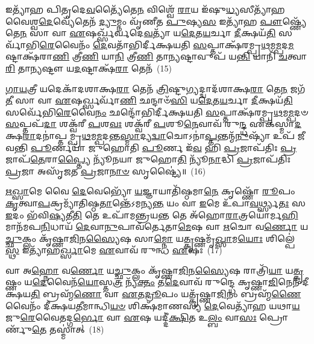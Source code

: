 𑌇𑌤𑍍𑌯𑌾᳴𑌹 𑌪𑌿𑌤𑍃𑌦𑍇\-\ul{𑌵}\-𑌤𑍍𑌯𑍈᳴𑌤𑍇\-\ul{𑌨} 𑌵𑌿𑌶𑍍𑌵𑍇᳴ \ul{𑌰𑌾}\-𑌯 𑌇᳴𑌷𑍁\-\ul{𑌧𑍍𑌯}\-𑌸𑍀𑌤𑍍𑌯𑌾᳴𑌹 𑌵𑍈𑌶𑍍𑌵\-\ul{𑌦𑍇}\-𑌵𑍍𑌯𑍇᳴𑌤𑍇𑌨᳴ \ul{𑌦𑍍𑌯𑍁}\-𑌮𑍍𑌨𑌂 𑌵𑍃᳴𑌣𑍀𑌤 \ul{𑌪𑍁}\-𑌷𑍍𑌯\-\ul{𑌸} 𑌇𑌤𑍍𑌯𑌾᳴𑌹 \ul{𑌪𑍗}\-𑌷𑍍𑌣𑍍𑌯𑍇᳴𑌤𑍇\-\ul{𑌨} 𑌸𑌾 𑌵𑌾 \ul{𑌏}\-𑌷𑌰𑍍𑌖𑍍𑌸᳴𑌰𑍍𑌵𑌦𑍇\-\ul{𑌵}\-𑌤𑍍𑌯𑌾᳴ 𑌯\-\ul{𑌦𑍇}\-𑌤\-\ul{𑌯}\-𑌰𑍍𑌚𑌾 \ul{𑌦𑍀}\-𑌕𑍍𑌷𑌯᳴\-\ul{𑌤𑌿} 𑌸𑌰𑍍𑌵𑌾᳴𑌭𑌿\-\ul{𑌰𑍇}\-𑌵𑍈𑌨𑌂᳴ \ul{𑌦𑍇}\-𑌵𑌤𑌾᳴𑌭𑌿𑌰𑍍𑌦𑍀𑌕𑍍𑌷𑌯𑌤𑌿 \ul{𑌸}\-𑌪𑍍𑌤𑌾𑌕𑍍𑌷᳴𑌰𑌮𑍍𑌪𑍍𑌰\-\ul{𑌥}\-𑌮\-\ul{𑌮𑍍𑌪}\-𑌦\-\ul{𑌮}\-𑌷𑍍𑌟𑌾𑌕𑍍𑌷᳴𑌰𑌾\-\ul{𑌣𑌿} 𑌤𑍍𑌰𑍀\-\ul{𑌣𑌿} 𑌯𑌾\-\ul{𑌨𑌿} 𑌤𑍍𑌰𑍀\-\ul{𑌣𑌿} 𑌤𑌾\-\ul{𑌨𑍍𑌯}\-𑌷𑍍𑌟𑌾𑌵𑍁𑌪᳴ 𑌯\-\ul{𑌨𑍍𑌤𑌿} 𑌯𑌾𑌨𑌿᳴ \ul{𑌚}\-𑌤𑍍𑌵𑌾\-\ul{𑌰𑌿} 𑌤𑌾\-\ul{𑌨𑍍𑌯}\-𑌷𑍍𑌟𑍗 𑌯\-\ul{𑌦}\-𑌷𑍍𑌟𑌾𑌕𑍍𑌷᳴\-\ul{𑌰𑌾} 𑌤𑍇𑌨᳴~(15)

\-\ul{𑌗𑌾}\-\-\ul{𑌯}\-𑌤𑍍𑌰𑍀 𑌯𑌦𑍇𑌕𑌾᳴\-𑌦𑌶𑌾𑌕𑍍𑌷\-\ul{𑌰𑌾} 𑌤𑍇𑌨᳴ \ul{𑌤𑍍𑌰𑌿}\-𑌷𑍍𑌟𑍁𑌗𑍍𑌯𑌦𑍍𑌦𑍍𑌵𑌾𑌦᳴𑌶𑌾𑌕𑍍𑌷\-\ul{𑌰𑌾} 𑌤𑍇\-\ul{𑌨} 𑌜𑌗᳴\-\ul{𑌤𑍀} 𑌸𑌾 𑌵𑌾 \ul{𑌏}\-𑌷𑌰𑍍𑌖𑍍𑌸𑌰𑍍𑌵𑌾᳴\-\ul{𑌣𑌿} 𑌛𑌨𑍍𑌦𑌾𑍞᳴\-\ul{𑌸𑌿} 𑌯\-\ul{𑌦𑍇}\-𑌤\-\ul{𑌯}\-𑌰𑍍𑌚𑌾 \ul{𑌦𑍀}\-𑌕𑍍𑌷𑌯᳴\-\ul{𑌤𑌿} 𑌸𑌰𑍍𑌵𑍇᳴𑌭𑌿\-\ul{𑌰𑍇}\-𑌵𑍈\-\ul{𑌨𑌂} 𑌛𑌨𑍍𑌦𑍋᳴𑌭𑌿𑌰𑍍𑌦𑍀𑌕𑍍𑌷𑌯𑌤𑌿 \ul{𑌸}\-𑌪𑍍𑌤𑌾𑌕𑍍𑌷᳴𑌰𑌮𑍍𑌪𑍍𑌰\-\ul{𑌥}\-𑌮\-\ul{𑌮𑍍𑌪}\-𑌦𑍞 \ul{𑌸}\-𑌪𑍍𑌤𑌪᳴\-\ul{𑌦𑌾} 𑌶𑌕𑍍𑌵᳴𑌰𑍀 \ul{𑌪}\-𑌶\-\ul{𑌵𑌃} 𑌶𑌕𑍍𑌵᳴𑌰𑍀 \ul{𑌪}\-𑌶𑍂\-\ul{𑌨𑍇}\-𑌵𑌾𑌵᳴ 𑌰𑍁\-\ul{𑌨𑍍𑌦𑍍𑌧} 𑌏𑌕᳴𑌸𑍍𑌮𑌾\-\ul{𑌦}\-𑌕𑍍𑌷\-\ul{𑌰𑌾}\-𑌦𑌨𑌾॑𑌪𑍍𑌤𑌮𑍍𑌪𑍍𑌰\-\ul{𑌥}\-𑌮\-\ul{𑌮𑍍𑌪}\-𑌦𑌨𑍍𑌤\-\ul{𑌸𑍍𑌮𑌾}\-𑌦𑍍𑌯\-\ul{𑌦𑍍𑌵𑌾}\-𑌚𑍋\-𑌽𑌨𑌾॑\-\ul{𑌪𑍍𑌤}\-𑌨𑍍𑌤𑌨𑍍𑌮᳴\-\ul{𑌨𑍁}\-𑌷𑍍𑌯𑌾᳴ 𑌉𑌪᳴ 𑌜𑍀𑌵𑌨𑍍𑌤𑌿 \ul{𑌪𑍂}\-𑌰𑍍𑌣𑌯𑌾᳴ 𑌜𑍁𑌹𑍋𑌤𑌿 \ul{𑌪𑍂}\-𑌰𑍍𑌣 𑌇᳴\-\ul{𑌵} 𑌹𑌿 \ul{𑌪𑍍𑌰}\-𑌜𑌾𑌪᳴𑌤𑌿𑌃 \ul{𑌪𑍍𑌰}\-𑌜𑌾𑌪᳴\-\ul{𑌤𑍇}\-𑌰𑌾\-\ul{𑌪𑍍𑌤𑍍𑌯𑍈} 𑌨𑍍𑌯𑍂᳴𑌨𑌯𑌾 𑌜𑍁𑌹𑍋\-\ul{𑌤𑌿} 𑌨𑍍𑌯𑍂᳴\-\ul{𑌨𑌾}\-𑌦𑍍𑌧𑌿 \ul{𑌪𑍍𑌰}\-𑌜𑌾𑌪᳴𑌤𑌿𑌃 \ul{𑌪𑍍𑌰}\-𑌜𑌾 𑌅𑌸𑍃᳴𑌜𑌤 \ul{𑌪𑍍𑌰}\-𑌜𑌾\-\ul{𑌨𑌾}\-\-\ul{𑍞} 𑌸𑍃𑌷𑍍𑌟𑍍𑌯𑍈॑॥~(16)

{\anuvakamend[{\-\ul{𑌅}\-𑌗𑍍𑌨\-\ul{𑌯𑍇} 𑌤𑌾 𑌵𑍃᳴𑌧𑌾\-\ul{𑌤𑍍𑌵𑍃}\-𑌚𑌾 \ul{𑌸}\-𑌖𑍍𑌯𑌨𑍍𑌤𑍇𑌨᳴ 𑌜𑍁𑌹𑍋\-\ul{𑌤𑌿} 𑌪𑌞𑍍𑌚᳴𑌦𑌶 𑌚}]}%

\-\ul{𑌋}\-\-\ul{𑌖𑍍𑌸𑌾}\-𑌮𑍇 𑌵𑍈 \ul{𑌦𑍇}\-𑌵𑍇𑌭𑍍𑌯𑍋᳴ \ul{𑌯}\-𑌜𑍍𑌞𑌾𑌯𑌾𑌤𑌿᳴𑌷𑍍𑌠𑌮𑌾\-\ul{𑌨𑍇} 𑌕𑍃𑌷𑍍𑌣𑍋᳴ \ul{𑌰𑍂}\-𑌪𑌂 \ul{𑌕𑍃}\-𑌤𑍍𑌵𑌾\-\ul{𑌪}\-𑌕𑍍𑌰𑌮𑍍𑌯𑌾᳴𑌤𑌿𑌷𑍍𑌠\-\ul{𑌤𑌾}\-𑌨𑍍𑌤𑍇᳴\-𑌽𑌮𑌨𑍍𑌯\-\ul{𑌨𑍍𑌤} 𑌯𑌂 𑌵𑌾 \ul{𑌇}\-𑌮𑍇 𑌉᳴𑌪𑌾\-\ul{𑌵}\-𑌰𑍍𑌥𑍍𑌸𑍍𑌯\-\ul{𑌤𑌃} 𑌸 \ul{𑌇}\-𑌦𑌂 𑌭᳴𑌵𑌿\-\ul{𑌷𑍍𑌯}\-𑌤𑍀\-\ul{𑌤𑌿} 𑌤𑍇 𑌉𑌪𑌾᳴𑌮𑌨𑍍𑌤𑍍𑌰𑌯\-\ul{𑌨𑍍𑌤} 𑌤𑍇 𑌅᳴𑌹𑍋\-\ul{𑌰𑌾}\-𑌤𑍍𑌰𑌯𑍋॑𑌰𑍍𑌮\-\ul{𑌹𑌿}\-𑌮𑌾𑌨᳴𑌮𑌪\-\ul{𑌨𑌿}\-𑌧𑌾𑌯᳴ \ul{𑌦𑍇}\-𑌵𑌾\-\ul{𑌨𑍁}\-𑌪𑌾𑌵᳴𑌰𑍍𑌤𑍇𑌤𑌾\-\ul{𑌮𑍇}\-𑌷 𑌵𑌾 \ul{𑌋}\-𑌚𑍋 𑌵\-\ul{𑌰𑍍𑌣𑍋} 𑌯\-\ul{𑌚𑍍𑌛𑍁}\-𑌕𑍍𑌲𑌂 𑌕𑍃᳴𑌷𑍍𑌣𑌾\-\ul{𑌜𑌿}\-𑌨\-\ul{𑌸𑍍𑌯𑍈}\-𑌷 𑌸𑌾\-\ul{𑌮𑍍𑌨𑍋} 𑌯\-\ul{𑌤𑍍𑌕𑍃}\-𑌷𑍍𑌣𑌮𑍃᳴\-\ul{𑌖𑍍𑌸𑌾}\-𑌮\-\ul{𑌯𑍋𑌃} 𑌶𑌿𑌲𑍍𑌪𑍇॑ \ul{𑌸𑍍𑌥} 𑌇𑌤𑍍𑌯𑌾᳴𑌹\-\ul{𑌰𑍍𑌖𑍍𑌸𑌾}\-𑌮𑍇 \ul{𑌏}\-𑌵𑌾𑌵᳴ 𑌰𑍁𑌨𑍍𑌧 \ul{𑌏}\-𑌷𑌃~(17)

𑌵𑌾 𑌅\-\ul{𑌹𑍍𑌨𑍋} 𑌵\-\ul{𑌰𑍍𑌣𑍋} 𑌯\-\ul{𑌚𑍍𑌛𑍁}\-𑌕𑍍𑌲𑌂 𑌕𑍃᳴𑌷𑍍𑌣𑌾\-\ul{𑌜𑌿}\-𑌨\-\ul{𑌸𑍍𑌯𑍈}\-𑌷 𑌰𑌾𑌤𑍍𑌰𑌿᳴\-\ul{𑌯𑌾} 𑌯\-\ul{𑌤𑍍𑌕𑍃}\-𑌷𑍍𑌣𑌂 𑌯\-\ul{𑌦𑍇}\-𑌵𑍈𑌨᳴\-\ul{𑌯𑍋}\-𑌸𑍍𑌤\-\ul{𑌤𑍍𑌰} 𑌨𑍍𑌯᳴\-\ul{𑌕𑍍𑌤𑌂} 𑌤\-\ul{𑌦𑍇}\-𑌵𑌾𑌵᳴ 𑌰𑍁𑌨𑍍𑌦𑍍𑌧𑍇 𑌕𑍃𑌷𑍍𑌣𑌾\-\ul{𑌜𑌿}\-𑌨𑍇𑌨᳴ 𑌦𑍀𑌕𑍍𑌷𑌯\-\ul{𑌤𑌿} 𑌬𑍍𑌰𑌹𑍍𑌮᳴\-\ul{𑌣𑍋} 𑌵𑌾 \ul{𑌏}\-𑌤\-\ul{𑌦𑍍𑌰𑍂}\-𑌪𑌂 𑌯𑌤𑍍𑌕𑍃᳴𑌷𑍍𑌣𑌾\-\ul{𑌜𑌿}\-𑌨𑌂 𑌬𑍍𑌰𑌹𑍍𑌮᳴\-\ul{𑌣𑍈}\-𑌵𑍈𑌨𑌂᳴ 𑌦𑍀𑌕𑍍𑌷𑌯\-\ul{𑌤𑍀}\-𑌮𑌾𑌨𑍍𑌧𑌿\-\ul{𑌯}\-\-\ul{𑍞} 𑌶𑌿𑌕𑍍𑌷᳴𑌮𑌾𑌣𑌸𑍍𑌯 \ul{𑌦𑍇}\-𑌵𑍇𑌤𑍍𑌯𑌾᳴𑌹 𑌯𑌥𑌾\-\ul{𑌯}\-𑌜𑍁\-\ul{𑌰𑍇}\-𑌵𑍈𑌤𑌦𑍍𑌗\-\ul{𑌰𑍍𑌭𑍋} 𑌵𑌾 \ul{𑌏}\-𑌷 𑌯𑌦𑍍𑌦𑍀॑\-\ul{𑌕𑍍𑌷𑌿}\-𑌤 𑌉\-\ul{𑌲𑍍𑌬𑌂} 𑌵𑌾\-\ul{𑌸𑌃} 𑌪𑍍𑌰𑍋𑌰𑍍𑌣𑍁᳴\-\ul{𑌤𑍇} 𑌤𑌸𑍍𑌮𑌾॑𑌤𑍍~(18)

